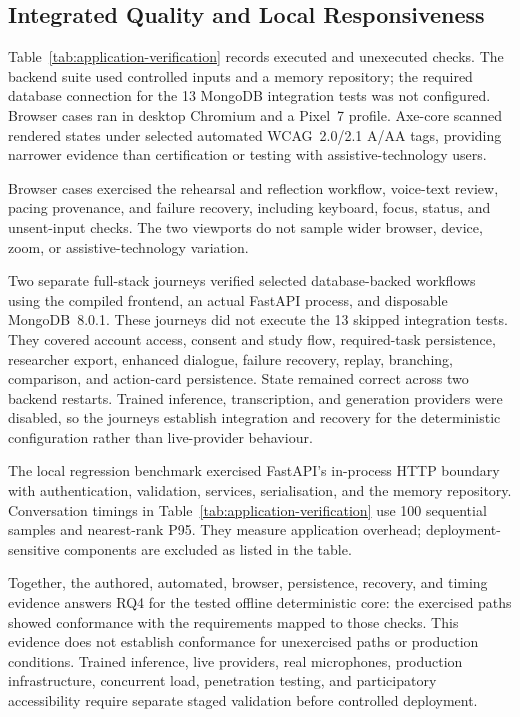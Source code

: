 \subsection{Integrated Quality and Local Responsiveness}
\label{subsec:automated-system-results}

Table~\ref{tab:application-verification} records executed and unexecuted checks. The backend suite used controlled inputs and a memory repository; the required database connection for the 13 MongoDB integration tests was not configured. Browser cases ran in desktop Chromium and a Pixel~7 profile. Axe-core scanned rendered states under selected automated WCAG~2.0/2.1 A/AA tags, providing narrower evidence than certification or testing with assistive-technology users.

Browser cases exercised the rehearsal and reflection workflow, voice-text review, pacing provenance, and failure recovery, including keyboard, focus, status, and unsent-input checks. The two viewports do not sample wider browser, device, zoom, or assistive-technology variation.

Two separate full-stack journeys verified selected database-backed workflows using the compiled frontend, an actual FastAPI process, and disposable MongoDB~8.0.1. These journeys did not execute the 13 skipped integration tests. They covered account access, consent and study flow, required-task persistence, researcher export, enhanced dialogue, failure recovery, replay, branching, comparison, and action-card persistence. State remained correct across two backend restarts. Trained inference, transcription, and generation providers were disabled, so the journeys establish integration and recovery for the deterministic configuration rather than live-provider behaviour.

The local regression benchmark exercised FastAPI's in-process HTTP boundary with authentication, validation, services, serialisation, and the memory repository. Conversation timings in Table~\ref{tab:application-verification} use 100 sequential samples and nearest-rank P95. They measure application overhead; deployment-sensitive components are excluded as listed in the table.

Together, the authored, automated, browser, persistence, recovery, and timing evidence answers RQ4 for the tested offline deterministic core: the exercised paths showed conformance with the requirements mapped to those checks. This evidence does not establish conformance for unexercised paths or production conditions. Trained inference, live providers, real microphones, production infrastructure, concurrent load, penetration testing, and participatory accessibility require separate staged validation before controlled deployment.

